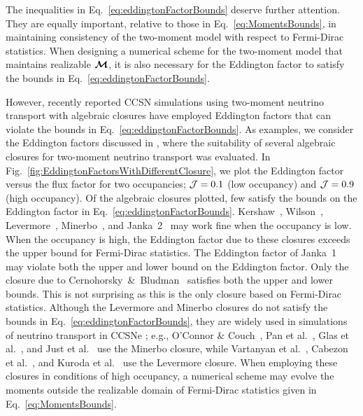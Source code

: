 The inequalities in Eq.~\eqref{eq:eddingtonFactorBounds} deserve further attention.  
They are equally important, relative to those in Eq.~\eqref{eq:MomentsBounds}, in maintaining consistency of the two-moment model with respect to Fermi-Dirac statistics.  
When designing a numerical scheme for the two-moment model that maintains realizable $\boldsymbol{\mathcal{M}}$, it is also necessary for the Eddington factor to satisfy the bounds in Eq.~\eqref{eq:eddingtonFactorBounds}.  

However, recently reported CCSN simulations using two-moment neutrino transport with algebraic closures have employed Eddington factors that can violate the bounds in Eq.~\eqref{eq:eddingtonFactorBounds}.  
As examples, we consider the Eddington factors discussed in \cite{murchikova_etal_2017}, where the suitability of several algebraic closures for two-moment neutrino transport was evaluated.  
In Fig.~\ref{fig:EddingtonFactorsWithDifferentClosure}, we plot the Eddington factor versus the flux factor for two occupancies; $\mathcal{J} = 0.1$ (low occupancy) and $\mathcal{J} = 0.9$ (high occupancy).  
Of the algebraic closures plotted, few satisfy the bounds on the Eddington factor in Eq.~\eqref{eq:eddingtonFactorBounds}.  
Kershaw~\cite{kershaw_1976}, Wilson~\cite{wilson_1975,leblancWilson_1970}, Levermore~\cite{levermore_1984}, Minerbo~\cite{minerbo_1978}, and Janka~2~\cite{janka_1992} may work fine when the occupancy is low.  
When the occupancy is high, the Eddington factor due to these closures exceeds the upper bound for Fermi-Dirac statistics.  
The Eddington factor of Janka~1~\cite{janka_1991} may violate both the upper and lower bound on the Eddington factor.  
Only the closure due to Cernohorsky~\&~Bludman~\cite{cernohorskyBludman_1994} satisfies both the upper and lower bounds.  
This is not surprising as this is the only closure based on Fermi-Dirac statistics.  
Although the Levermore and Minerbo closures do not satisfy the bounds in Eq.~\eqref{eq:eddingtonFactorBounds}, they are widely used in simulations of neutrino transport in CCSNe ; e.g., O'Connor \& Couch~\cite{oConnorCouch_2018}, Pan et al.~\cite{pan_etal_2018}, Glas et al.~\cite{glas_etal_2018}, and Just et al.~\cite{just_etal_2018} use the Minerbo closure, while Vartanyan et al.~\cite{vartanyan_etal_2018}, Cabezon et al.~\cite{cabezon_etal_2018}, and Kuroda et al.~\cite{kuroda_etal_2016} use the Levermore closure.  
When employing these closures in conditions of high occupancy, a numerical scheme may evolve the moments outside the realizable domain of Fermi-Dirac statistics given in Eq.~\eqref{eq:MomentsBounds}.  

